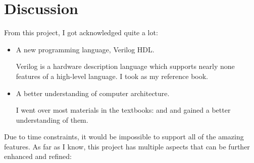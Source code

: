 \documentclass{article}
\begin{document}
%
%

\section{Discussion}
From this project, I got acknowledged quite a lot:
\begin{itemize}
\item
A new programming language, Verilog HDL.

Verilog is a hardware description language which supports nearly none features of a high-level language. I took \cite{palnitkar2003verilog} as my reference book.
\item
A better understanding of computer architecture.

I went over most materials in the textbooks: \cite{hennessy2011computer} and \cite{patterson2013computer} and gained a better understanding of them.
\end{itemize}
Due to time constraints, it would be impossible to support all of the amazing features. As far as I know, this project has multiple aspects that can be further enhanced and refined:
\end{document}
